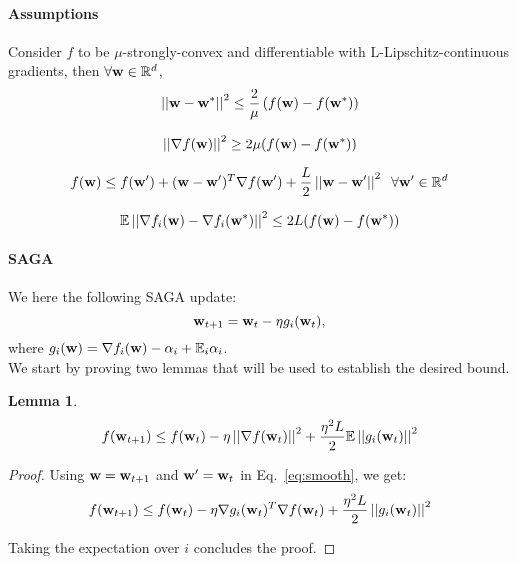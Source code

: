 \documentclass[12pt]{article}
\newcommand{\sqnorm}[1]{\left|\left|#1\right|\right|^2}
\newcommand{\w}{{\bf w}}
\newcommand{\wstar}{{\bf w^*}}
\newcommand{\E}{\mathbb{E}}
\newtheorem{lemma}[theorem]{Lemma}
\begin{document}
\newpage



\paragraph{Assumptions} Consider $f$ to be $\mu$-strongly-convex and differentiable with L-Lipschitz-continuous gradients, then $\forall \w \in \mathbb{R}^d$,
\begin{equation}
\sqnorm{\w - \wstar} \leq \frac{2}{\mu} \left( f(\w) - f(\wstar) \right)
\end{equation}

\begin{equation}
\sqnorm{\nabla f(\w)} \geq 2 \mu ( f(\w) - f(\wstar) )
\label{eq:strong_convex}
\end{equation}


\begin{equation}
f(\w) \leq f(\w') + (\w-\w')^T \nabla f(\w') + \frac{L}{2} \sqnorm{\w-\w'} \;\; \forall \w' \in \mathbb{R}^d
\label{eq:smooth}
\end{equation}

\begin{equation}
\E \sqnorm{\nabla f_i(\w) - \nabla f_i(\wstar)} \leq 2L (f(\w) - f(\wstar))
\label{eq:bound_variance_f}
\end{equation}

\paragraph{SAGA}

We here the following SAGA update:
\begin{equation}
\w_{t+1} = \w_t - \eta g_i(\w_t),
\end{equation}
where $g_i(\w) = \nabla f_i(\w) - \alpha_i + \E_i \alpha_i $.\\

We start by proving two lemmas that will be used to establish the desired bound.

\begin{lemma}
\label{lemma:bound_f}
\begin{equation}
f(\w_{t+1}) \leq f(\w_t) - \eta \sqnorm{\nabla f(\w_t)} + \frac{\eta^2 L}{2} \E \sqnorm{g_i(\w_t)}
\label{eq:bound_f}
\end{equation}
\end{lemma}
\begin{proof}

Using $\w = \w_{t+1}$ and $\w' = \w_t$ in Eq.~\ref{eq:smooth}, we get:
\begin{equation}
f(\w_{t+1}) \leq f(\w_t) - \eta \nabla g_i(\w_t)^T \nabla f(\w_t) + \frac{\eta^2 L}{2} \sqnorm{g_i(\w_t)}
\end{equation}

Taking the expectation over $i$ concludes the proof.
\end{proof}
\end{document}

